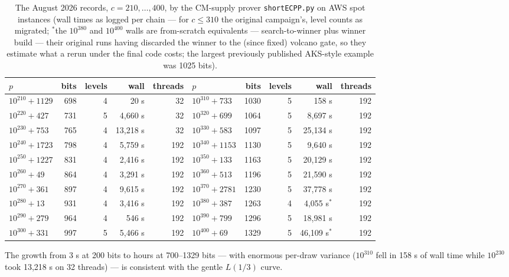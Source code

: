 \documentclass[11pt]{amsart}
\newcommand{\osf}{\cite{OSF}}
\theoremstyle{plain}
\theoremstyle{definition}
\theoremstyle{remark}
\begin{document}
\begin{table}[htbp]
\centering\footnotesize
\begin{tabular}{@{}lrrrr@{\qquad}lrrrr@{}}
\toprule
$p$ & bits & levels & wall & threads & $p$ & bits & levels & wall & threads\\
\midrule
$10^{210}+1129$ & 698 & 4 & 20 s & 32 & $10^{310}+733$ & 1030 & 5 & 158 s & 192\\
$10^{220}+427$  & 731 & 5 & 4{,}660 s & 32 & $10^{320}+699$ & 1064 & 5 & 8{,}697 s & 192\\
$10^{230}+753$  & 765 & 4 & 13{,}218 s & 32 & $10^{330}+583$ & 1097 & 5 & 25{,}134 s & 192\\
$10^{240}+1723$ & 798 & 4 & 5{,}759 s & 192 & $10^{340}+1153$ & 1130 & 5 & 9{,}640 s & 192\\
$10^{250}+1227$ & 831 & 4 & 2{,}416 s & 192 & $10^{350}+133$ & 1163 & 5 & 20{,}129 s & 192\\
$10^{260}+49$   & 864 & 4 & 3{,}291 s & 192 & $10^{360}+513$ & 1196 & 5 & 21{,}590 s & 192\\
$10^{270}+361$  & 897 & 4 & 9{,}615 s & 192 & $10^{370}+2781$ & 1230 & 5 & 37{,}778 s & 192\\
$10^{280}+13$   & 931 & 4 & 3{,}416 s & 192 & $10^{380}+387$ & 1263 & 4 & 4{,}055 s$^{*}$ & 192\\
$10^{290}+279$  & 964 & 4 & 546 s & 192 & $10^{390}+799$ & 1296 & 5 & 18{,}981 s & 192\\
$10^{300}+331$  & 997 & 5 & 5{,}466 s & 192 & $10^{400}+69$ & 1329 & 5 & 46{,}109 s$^{*}$ & 192\\
\bottomrule
\end{tabular}
\medskip
\caption{The August 2026 records, $c = 210, \dots, 400$, by the CM-supply prover
\texttt{shortECPP.py} \osf{} on AWS spot instances (wall times as logged per chain --- for
$c \le 310$ the original campaign's, level counts as migrated; ${}^{*}$the $10^{380}$ and
$10^{400}$ walls are from-scratch equivalents --- search-to-winner plus winner build --- their
original runs having discarded the winner to the (since fixed) volcano gate, so they estimate what
a rerun under the final code costs; the largest previously published AKS-style example was 1025 bits).}
\label{tab:shortrecords}
\end{table}

The growth from 3 s at 200 bits to hours at 700--1329 bits --- with enormous per-draw variance
($10^{310}$ fell in 158 s of wall time while $10^{230}$ took 13{,}218 s on 32 threads) --- is
consistent with the gentle $L(1/3)$ curve.
\end{document}
